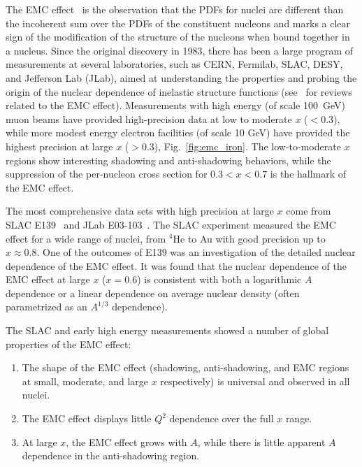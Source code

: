 The EMC effect~\cite{Aubert:1983xm} is the observation that the PDFs for nuclei are different than
the incoherent sum over the PDFs of the constituent nucleons and marks a clear sign of the modification
of the structure of the nucleons when bound together in a nucleus.
Since the original discovery in 1983, there has been a large
program of measurements at several laboratories, such as CERN, Fermilab, SLAC, DESY, and Jefferson Lab (JLab),
aimed at understanding the properties and probing the origin of the nuclear dependence of inelastic
structure functions (see~\cite{Geesaman:1995yd, Malace:2014uea, Hen:2016kwk} for reviews related to the EMC effect).
Measurements with high energy (of scale 100~GeV) muon beams have provided high-precision data at low to
moderate $x$ ($<0.3$), while more modest energy electron facilities (of scale 10 GeV) have provided
the highest precision at large $x$ ($>0.3$), Fig.~\ref{fig:emc_iron}.  The low-to-moderate $x$
regions show interesting shadowing and anti-shadowing behaviors, while the suppression of the
per-nucleon cross section for $0.3<x<0.7$ is the hallmark of the EMC effect.

The most comprehensive data sets with high precision at large $x$ come from SLAC E139~\cite{Gomez:1993ri} and JLab E03-103~\cite{Seely:2009gt}. The SLAC experiment
measured the EMC effect for a wide range of nuclei, from $^4$He to Au with good precision up to
$x\approx0.8$.  One of the outcomes of E139 was an investigation of the detailed nuclear dependence of the EMC
effect. It was found that the nuclear dependence of the EMC effect at large $x$ ($x=0.6$) is consistent
with both a logarithmic $A$ dependence or a linear dependence on average nuclear density (often parametrized as an $A^{1/3}$ dependence).

The SLAC and early high energy measurements showed a number of global properties of the EMC effect:
\begin{enumerate}
 \item{The shape of the EMC effect (shadowing, anti-shadowing, and EMC regions at small, moderate, and
  large $x$ respectively) is universal and observed in all nuclei.}
 \item{The EMC effect displays little $Q^2$ dependence over the full $x$ range.}
 \item{At large $x$, the EMC effect grows with $A$, while there is little apparent $A$ dependence in the
   anti-shadowing region.}
\end{enumerate}

